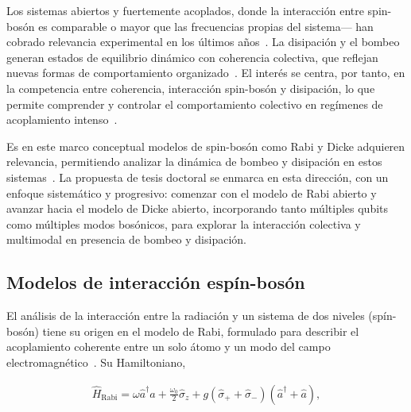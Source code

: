 \documentclass[onecolumn,notitlepage,letterpaper,aps,pra,12pt]{article}
\numberwithin{equation}{section}
\begin{document}
Los sistemas abiertos y fuertemente acoplados, donde la interacción entre spin-bosón es comparable o mayor que las frecuencias propias del sistema— han cobrado relevancia experimental en los últimos años~\cite{Grifoni1999,ZhangHou2015,Burger2022,Fazio2025}. La disipación y el bombeo generan estados de equilibrio dinámico con coherencia colectiva, que reflejan nuevas formas de comportamiento organizado~\cite{Sieberer2016,Halati2020,Chelpanova2025}. El interés se centra, por tanto, en la competencia entre coherencia, interacción spin-bosón y disipación, lo que permite comprender y controlar el comportamiento colectivo en regímenes de acoplamiento intenso~\cite{subasi2012,FornDiaz2019,Kirton2018,LeBoite2020,roses2020}.

Es en este marco conceptual modelos de spin-bosón como Rabi y Dicke adquieren relevancia, permitiendo analizar la dinámica de bombeo y disipación en estos sistemas~\cite{henriet2014,hwang2018,DiBello2024-2,Nagy10,Klinder15}. La propuesta de tesis doctoral se enmarca en esta dirección, con un enfoque sistemático y progresivo: comenzar con el modelo de Rabi abierto y avanzar hacia el modelo de Dicke abierto, incorporando tanto múltiples qubits como múltiples modos bosó\-nicos, para explorar la interacción colectiva y multimodal en presencia de bombeo y disipación.


\subsection{Modelos de interacción espín-bosón}

El análisis de la interacción entre la radiación y un sistema de dos niveles (spín-bosón) tiene su origen en el modelo de Rabi, formulado para describir el acoplamiento coherente entre un solo átomo y un modo del campo electromagnético~\cite{rabi1936}. Su Hamiltoniano,

\begin{gather}\label{Hamiltoniano de Rabi}
    \hat{H}_{\text{Rabi}} = \omega\hat{a}^{\dagger}\hat{a} + \frac{\omega_{0}}{2}\hat{\sigma}_{z} + g\left( \hat{\sigma}_{+} + \hat{\sigma}_{-} \right)\left( \hat{a}^{\dagger} + \hat{a} \right),
\end{gather}
\end{document}
